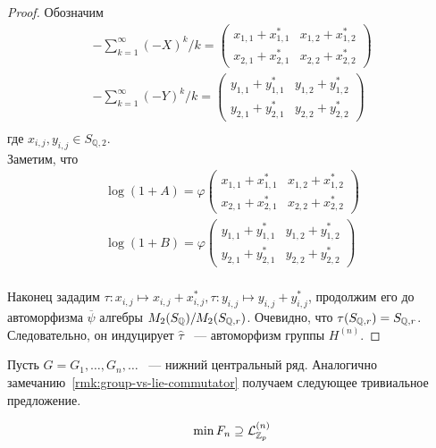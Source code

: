 \begin{proof}
    Обозначим
    \begin{gather*}
        -\sum\limits_{k=1}^{\infty} (-X)^k / k =
        \begin{pmatrix}
            x_{1,1} + x_{1,1}^* & x_{1,2} + x_{1,2}^* \\
            x_{2,1} + x_{2,1}^* & x_{2,2} + x_{2,2}^*
        \end{pmatrix}\\
        -\sum\limits_{k=1}^{\infty} (-Y)^k / k =
        \begin{pmatrix}
            y_{1,1} + y_{1,1}^* & y_{1,2} + y_{1,2}^* \\
            y_{2,1} + y_{2,1}^* & y_{2,2} + y_{2,2}^*
        \end{pmatrix}\\
    \end{gather*}
    где $x_{i,j}, y_{i,j} \in S_{\mathbb{Q}, 2}$.\\
    Заметим, что
    \begin{gather*}
        \log(1 + A) = \varphi
        \begin{pmatrix}
            x_{1,1} + x_{1,1}^* & x_{1,2} + x_{1,2}^* \\
            x_{2,1} + x_{2,1}^* & x_{2,2} + x_{2,2}^*
        \end{pmatrix}\\
        \log(1 + B) = \varphi
        \begin{pmatrix}
            y_{1,1} + y_{1,1}^* & y_{1,2} + y_{1,2}^* \\
            y_{2,1} + y_{2,1}^* & y_{2,2} + y_{2,2}^*
        \end{pmatrix}\\
    \end{gather*}

    Наконец зададим $\tau: x_{i,j}\mapsto x_{i,j} + x_{i,j}^*, \tau: y_{i,j}\mapsto y_{i,j} + y_{i,j}^*$, продолжим его до автоморфизма $\overline{\psi}$ алгебры
    $M_2(S_{\mathbb{Q}})/M_2(S_{\mathbb{Q}, r})$.
    Очевидно, что $\tau(S_{\mathbb{Q}, r})=S_{\mathbb{Q}, r}$.
    Следовательно, он индуцирует $\hat{\tau}$ ~--- автоморфизм группы $H^{(n)}$.


\end{proof}

Пусть $G=G_1,\ldots,G_n,\ldots$ ~--- нижний центральный ряд.
Аналогично замечанию~\ref{rmk:group-vs-lie-commutator} получаем следующее тривиальное предложение.
\begin{proposition}
    \label{prp:G_n-contains-L_n}
    \[
        \min F_n \supseteq \mathcal{L}^{(n)}_{\mathbb{Z}_p}
    \]
\end{proposition}

